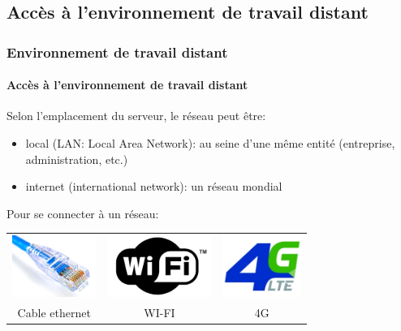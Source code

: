 \documentclass[xcolor=table]{beamer}
\begin{document}
%
%

\subsection{Accès à l'environnement de travail distant}

\begin{frame}
\frametitle{Environnement de travail distant}
\framesubtitle{Accès à l'environnement de travail distant}

Selon l'emplacement du serveur, le réseau peut être:
\begin{itemize}
	\item local (LAN: Local Area Network): au seine d'une même entité (entreprise, administration, etc.)
	\item internet (international network): un réseau mondial
\end{itemize}

Pour se connecter à un réseau:

\begin{tabular}{ccc}
	\includegraphics[height=2cm]{../img/Bweb01-environnement/ethernet.jpg} &
	\includegraphics[height=2cm]{../img/Bweb01-environnement/wifi.png} &
	\includegraphics[height=2cm]{../img/Bweb01-environnement/4g.jpeg} \\
	
	Cable ethernet &
	WI-FI &
	4G \\
\end{tabular}

\end{frame}
\end{document}
